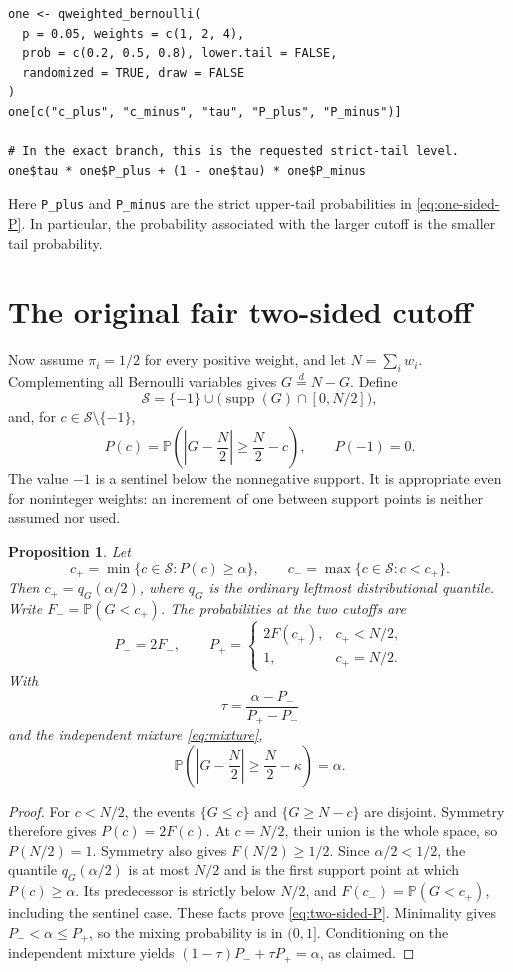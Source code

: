 \documentclass[11pt,letterpaper]{article}
\newtheorem{proposition}{Proposition}[section]
\DeclareMathOperator{\supp}{supp}
\newcommand{\Pbb}{\mathbb P}
\begin{document}
\begin{lstlisting}
one <- qweighted_bernoulli(
  p = 0.05, weights = c(1, 2, 4),
  prob = c(0.2, 0.5, 0.8), lower.tail = FALSE,
  randomized = TRUE, draw = FALSE
)
one[c("c_plus", "c_minus", "tau", "P_plus", "P_minus")]

# In the exact branch, this is the requested strict-tail level.
one$tau * one$P_plus + (1 - one$tau) * one$P_minus
\end{lstlisting}
Here \texttt{P\_plus} and \texttt{P\_minus} are the strict upper-tail
probabilities in \eqref{eq:one-sided-P}. In particular, the probability
associated with the larger cutoff is the smaller tail probability.

\section{The original fair two-sided cutoff}

Now assume $\pi_i=1/2$ for every positive weight, and let $N=\sum_iw_i$.
Complementing all Bernoulli variables gives $G\overset d=N-G$. Define
\[
\mathcal S=\{-1\}\cup\bigl(\supp(G)\cap[0,N/2]\bigr),
\]
and, for $c\in\mathcal S\setminus\{-1\}$,
\[
P(c)=\Pbb\!\left(\left|G-\frac N2\right|\ge\frac N2-c\right),
\qquad P(-1)=0.
\]
The value $-1$ is a sentinel below the nonnegative support. It is appropriate
even for noninteger weights: an increment of one between support points is
neither assumed nor used.

\begin{proposition}\label{prop:two-sided}
Let
\[
c_+=\min\{c\in\mathcal S:P(c)\ge\alpha\},\qquad
c_-=\max\{c\in\mathcal S:c<c_+\}.
\]
Then $c_+=q_G(\alpha/2)$, where $q_G$ is the ordinary leftmost distributional
quantile. Write $F_-=\Pbb(G<c_+)$. The probabilities at the two cutoffs are
\begin{equation}\label{eq:two-sided-P}
P_-=2F_-,\qquad
P_+=\begin{cases}
2F(c_+),&c_+<N/2,\\
1,&c_+=N/2.
\end{cases}
\end{equation}
With
\begin{equation}\label{eq:two-sided-tau}
\tau=\frac{\alpha-P_-}{P_+-P_-}
\end{equation}
and the independent mixture \eqref{eq:mixture},
\[
\Pbb\!\left(\left|G-\frac N2\right|\ge\frac N2-\kappa\right)=\alpha.
\]
\end{proposition}
\begin{proof}
For $c<N/2$, the events $\{G\le c\}$ and $\{G\ge N-c\}$ are disjoint.
Symmetry therefore gives $P(c)=2F(c)$. At $c=N/2$, their union is the whole
space, so $P(N/2)=1$. Symmetry also gives $F(N/2)\ge1/2$. Since
$\alpha/2<1/2$, the quantile $q_G(\alpha/2)$ is at most $N/2$ and is the first
support point at which $P(c)\ge\alpha$. Its predecessor is strictly below
$N/2$, and $F(c_-)=\Pbb(G<c_+)$, including the sentinel case. These facts prove
\eqref{eq:two-sided-P}. Minimality gives $P_-<\alpha\le P_+$, so the mixing
probability is in $(0,1]$. Conditioning on the independent mixture yields
$(1-\tau)P_-+\tau P_+=\alpha$, as claimed.
\end{proof}
\end{document}
